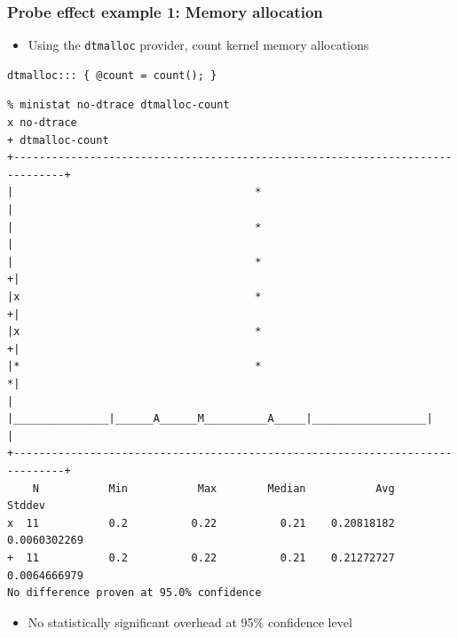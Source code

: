 \begin{frame}[fragile]
  \frametitle{Probe effect example 1: Memory allocation}

  \begin{itemize}
    \item Using the \texttt{dtmalloc} provider, count kernel memory allocations
  \end{itemize}

  \pause

  \begin{small}
\begin{verbatim}
dtmalloc::: { @count = count(); }
\end{verbatim}
  \end{small}

  \pause

  \begin{center}
    \begin{tiny}
      \begin{verbatim}
% ministat no-dtrace dtmalloc-count
x no-dtrace
+ dtmalloc-count
+------------------------------------------------------------------------------+
|                                      *                                       |
|                                      *                                       |
|                                      *                                      +|
|x                                     *                                      +|
|x                                     *                                      +|
|*                                     *                                      *|
|        |_______________|______A______M__________A_____|__________________|   |
+------------------------------------------------------------------------------+
    N           Min           Max        Median           Avg        Stddev
x  11           0.2          0.22          0.21    0.20818182  0.0060302269
+  11           0.2          0.22          0.21    0.21272727  0.0064666979
No difference proven at 95.0% confidence
\end{verbatim}
      \end{tiny}
  \end{center}

  \begin{itemize}
    \item No statistically significant overhead at 95\% confidence level
  \end{itemize}
\end{frame}

